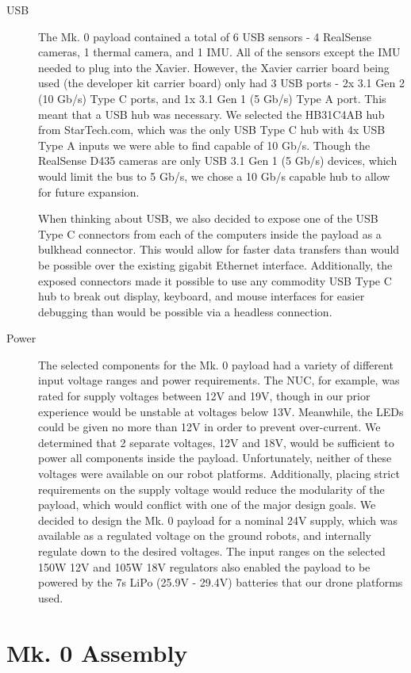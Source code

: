 \begin{description}
	\item[USB] The Mk. 0 payload contained a total of 6 USB sensors - 4 RealSense cameras, 1 thermal camera, and 1 IMU. All of the sensors except the IMU needed to plug into the Xavier. However, the Xavier carrier board being used (the developer kit carrier board) only had 3 USB ports - 2x 3.1 Gen 2 (10 Gb/s) Type C ports, and 1x 3.1 Gen 1 (5 Gb/s) Type A port. This meant that a USB hub was necessary. We selected the HB31C4AB hub from StarTech.com, which was the only USB Type C hub with 4x USB Type A inputs we were able to find capable of 10 Gb/s. Though the RealSense D435 cameras are only USB 3.1 Gen 1 (5 Gb/s) devices, which would limit the bus to 5 Gb/s, we chose a 10 Gb/s capable hub to allow for future expansion.
	
	When thinking about USB, we also decided to expose one of the USB Type C connectors from each of the computers inside the payload as a bulkhead connector. This would allow for faster data transfers than would be possible over the existing gigabit Ethernet interface. Additionally, the exposed connectors made it possible to use any commodity USB Type C hub to break out display, keyboard, and mouse interfaces for easier debugging than would be possible via a headless connection.
	
	\item[Power] The selected components for the Mk. 0 payload had a variety of different input voltage ranges and power requirements. The NUC, for example, was rated for supply voltages between 12V and 19V, though in our prior experience would be unstable at voltages below 13V. Meanwhile, the LEDs could be given no more than 12V in order to prevent over-current. We determined that 2 separate voltages, 12V and 18V, would be sufficient to power all components inside the payload. Unfortunately, neither of these voltages were available on our robot platforms. Additionally, placing strict requirements on the supply voltage would reduce the modularity of the payload, which would conflict with one of the major design goals. We decided to design the Mk. 0 payload for a nominal 24V supply, which was available as a regulated voltage on the ground robots, and internally regulate down to the desired voltages. The input ranges on the selected 150W 12V and 105W 18V regulators also enabled the payload to be powered by the 7s LiPo (25.9V - 29.4V) batteries that our drone platforms used.
	
\end{description}

\section{Mk. 0 Assembly}

